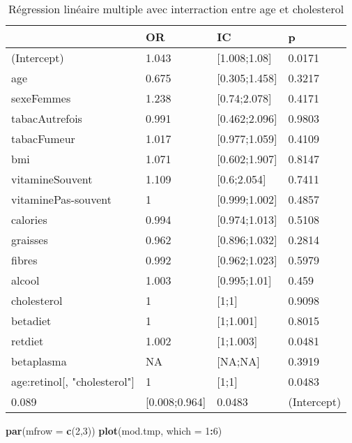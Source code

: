 \documentclass[]{article}
\newenvironment{Shaded}{\begin{snugshade}}{\end{snugshade}}
\newcommand{\KeywordTok}[1]{\textcolor[rgb]{0.13,0.29,0.53}{\textbf{#1}}}
\newcommand{\DataTypeTok}[1]{\textcolor[rgb]{0.13,0.29,0.53}{#1}}
\newcommand{\DecValTok}[1]{\textcolor[rgb]{0.00,0.00,0.81}{#1}}
\newcommand{\OperatorTok}[1]{\textcolor[rgb]{0.81,0.36,0.00}{\textbf{#1}}}
\newcommand{\NormalTok}[1]{#1}
\begin{document}
\begin{table}

\caption{\label{tab:unnamed-chunk-83}Régression linéaire multiple avec interraction entre age et cholesterol}
\centering
\begin{tabular}[t]{l|l|l|l}
\hline
  & OR & IC & p\\
\hline
\rowcolor[HTML]{BBD2E1}  (Intercept) & 1.043 & [1.008;1.08] & 0.0171\\
\hline
age & 0.675 & [0.305;1.458] & 0.3217\\
\hline
\rowcolor[HTML]{BBD2E1}  sexeFemmes & 1.238 & [0.74;2.078] & 0.4171\\
\hline
tabacAutrefois & 0.991 & [0.462;2.096] & 0.9803\\
\hline
\rowcolor[HTML]{BBD2E1}  tabacFumeur & 1.017 & [0.977;1.059] & 0.4109\\
\hline
bmi & 1.071 & [0.602;1.907] & 0.8147\\
\hline
\rowcolor[HTML]{BBD2E1}  vitamineSouvent & 1.109 & [0.6;2.054] & 0.7411\\
\hline
vitaminePas-souvent & 1 & [0.999;1.002] & 0.4857\\
\hline
\rowcolor[HTML]{BBD2E1}  calories & 0.994 & [0.974;1.013] & 0.5108\\
\hline
graisses & 0.962 & [0.896;1.032] & 0.2814\\
\hline
\rowcolor[HTML]{BBD2E1}  fibres & 0.992 & [0.962;1.023] & 0.5979\\
\hline
alcool & 1.003 & [0.995;1.01] & 0.459\\
\hline
\rowcolor[HTML]{BBD2E1}  cholesterol & 1 & [1;1] & 0.9098\\
\hline
betadiet & 1 & [1;1.001] & 0.8015\\
\hline
\rowcolor[HTML]{BBD2E1}  retdiet & 1.002 & [1;1.003] & 0.0481\\
\hline
betaplasma & NA & [NA;NA] & 0.3919\\
\hline
\rowcolor[HTML]{BBD2E1}  age:retinol[, "cholesterol"] & 1 & [1;1] & 0.0483\\
\hline
0.089 & [0.008;0.964] & 0.0483 & (Intercept)\\
\hline
\end{tabular}
\end{table}

\begin{Shaded}
\begin{Highlighting}[]
\KeywordTok{par}\NormalTok{(}\DataTypeTok{mfrow =} \KeywordTok{c}\NormalTok{(}\DecValTok{2}\NormalTok{,}\DecValTok{3}\NormalTok{))}
\KeywordTok{plot}\NormalTok{(mod.tmp, }\DataTypeTok{which =} \DecValTok{1}\OperatorTok{:}\DecValTok{6}\NormalTok{)}
\end{Highlighting}
\end{Shaded}
\end{document}
